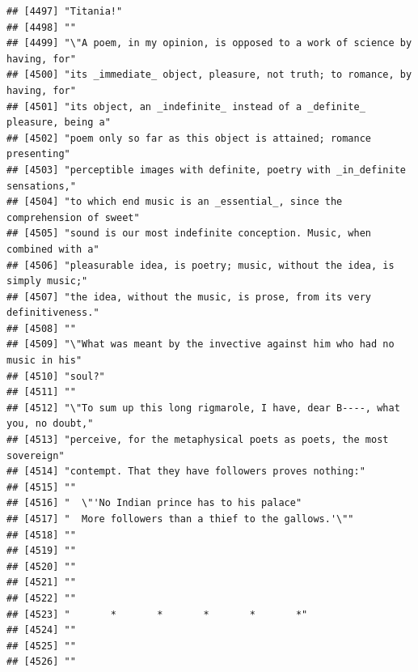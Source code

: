 \documentclass{article}\usepackage[]{graphicx}\usepackage[]{color}
\makeatletter
\newenvironment{kframe}{%
 \def\at@end@of@kframe{}%
 \ifinner\ifhmode%
  \def\at@end@of@kframe{\end{minipage}}%
  \begin{minipage}{\columnwidth}%
 \fi\fi%
 \def\FrameCommand##1{\hskip\@totalleftmargin \hskip-\fboxsep
 \colorbox{shadecolor}{##1}\hskip-\fboxsep
     \hskip-\linewidth \hskip-\@totalleftmargin \hskip\columnwidth}%
 \MakeFramed {\advance\hsize-\width
   \@totalleftmargin\z@ \linewidth\hsize
   \@setminipage}}%
 {\par\unskip\endMakeFramed%
 \at@end@of@kframe}
\newenvironment{knitrout}{}{} %
\makeatother
\begin{document}
\begin{knitrout}
\begin{kframe}
\begin{verbatim}
## [4497] "Titania!"                                                                    
## [4498] ""                                                                            
## [4499] "\"A poem, in my opinion, is opposed to a work of science by having, for"     
## [4500] "its _immediate_ object, pleasure, not truth; to romance, by having, for"     
## [4501] "its object, an _indefinite_ instead of a _definite_ pleasure, being a"       
## [4502] "poem only so far as this object is attained; romance presenting"             
## [4503] "perceptible images with definite, poetry with _in_definite sensations,"      
## [4504] "to which end music is an _essential_, since the comprehension of sweet"      
## [4505] "sound is our most indefinite conception. Music, when combined with a"        
## [4506] "pleasurable idea, is poetry; music, without the idea, is simply music;"      
## [4507] "the idea, without the music, is prose, from its very definitiveness."        
## [4508] ""                                                                            
## [4509] "\"What was meant by the invective against him who had no music in his"       
## [4510] "soul?"                                                                       
## [4511] ""                                                                            
## [4512] "\"To sum up this long rigmarole, I have, dear B----, what you, no doubt,"    
## [4513] "perceive, for the metaphysical poets as poets, the most sovereign"           
## [4514] "contempt. That they have followers proves nothing:"                          
## [4515] ""                                                                            
## [4516] "  \"'No Indian prince has to his palace"                                     
## [4517] "  More followers than a thief to the gallows.'\""                            
## [4518] ""                                                                            
## [4519] ""                                                                            
## [4520] ""                                                                            
## [4521] ""                                                                            
## [4522] ""                                                                            
## [4523] "       *       *       *       *       *"                                    
## [4524] ""                                                                            
## [4525] ""                                                                            
## [4526] ""                                                                            

\end{verbatim}
\end{kframe}
\end{knitrout}
\end{document}
